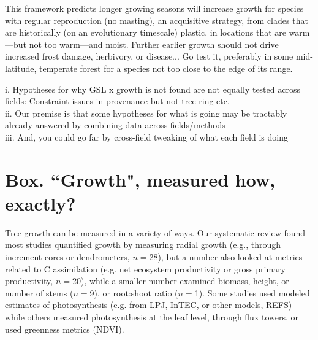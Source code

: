 \documentclass[11pt]{article}
\begin{document}
This framework predicts longer growing seasons will increase growth for species with regular reproduction (no masting), an acquisitive strategy, from clades that are historically (on an evolutionary timescale) plastic, in locations that are warm---but not too warm---and moist. Further earlier growth should not drive increased frost damage, herbivory, or disease... Go test it, preferably in some mid-latitude, temperate forest for a species not too close to the edge of its range.


i. Hypotheses for why GSL x growth is not found are not equally tested across fields: Constraint issues in provenance but not tree ring etc.\\
ii. Our premise is that some hypotheses for what is going may be tractably already answered by combining data across fields/methods\\
iii. And, you could go far by cross-field tweaking of what each field is doing

\newpage
\section{Box. ``Growth", measured how, exactly?}
Tree growth can be measured in a variety of ways. Our systematic review found most studies quantified growth by measuring radial growth (e.g., through increment cores or dendrometers, $n=$28), but a number also looked at metrics related to C assimilation (e.g. net ecosystem productivity or gross primary productivity, $n=$20), while a smaller number examined biomass, height, or number of stems ($n=$9), or root:shoot ratio ($n=$1). Some studies used modeled estimates of photosynthesis (e.g. from LPJ, InTEC, or other models, REFS) while others measured photosynthesis at the leaf level, through flux towers, or used greenness metrics (NDVI). 
\end{document}
